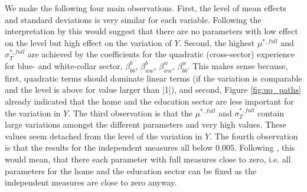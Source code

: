\documentclass[a4paper,12pt]{article}
\begin{document}
We make the following four main observations. First, the level of mean effects and standard deviations is very similar for each variable. Following the interpretation by \cite{ge2017extending} this would suggest that there are no parameters with low effect on the level but high effect on the variation of $Y$. Second, the highest $\mu^{*,full}$ and $\sigma^{*,full}_T$ are achieved by the coefficients for the quadratic (cross-sector) experience for blue- and white-collar sector, $\beta^b_{bb}$, $\beta^b_{ww}$, $\beta^w_{ww}$, $\beta^w_{bb}$. This makes sense because, first, quadratic terms should dominate linear terms (if the variation is comparable and the level is above for value larger than |1|), and second, Figure \ref{fig:uq_paths} already indicated that the home and the education sector are less important for the variation in $Y$. The third observation is that the $\mu^{*,full}$ and $\sigma^{*,full}_T$ contain large variations amongst the different parameters and very high values. These values seem detached from the level of the variation in $Y$. The fourth observation is that the results for the independent measures all below 0.005. Following \cite{ge2014efficient}, this would mean, that there each parameter with full measures close to zero, i.e. all parameters for the home and the education sector can be fixed as the independent measures are close to zero anyway.\\
\end{document}
